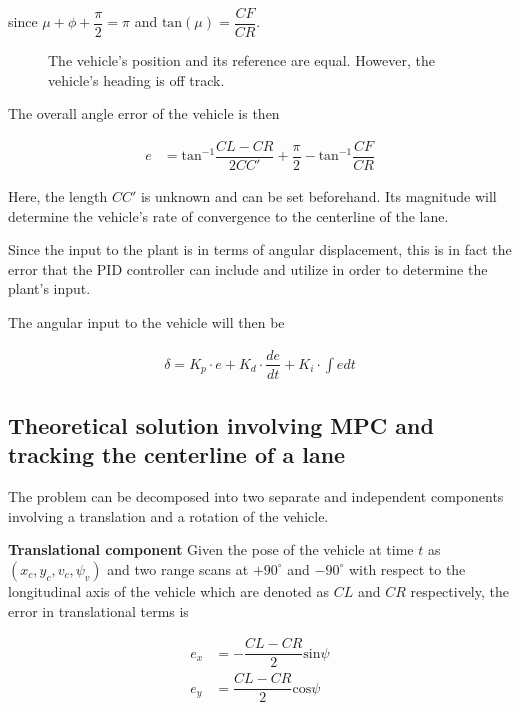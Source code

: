 \documentclass[oneside,12pt]{article}
\begin{document}
    since $\mu + \phi + \dfrac{\pi}{2} = \pi$ and $\text{tan}(\mu) = \dfrac{CF}{CR}$.

    \begin{figure}[H]\centering
      \scalebox{1}{}
      \caption{The vehicle's position and its reference are equal. However,
        the vehicle's heading is off track.}
      \label{}
    \end{figure}

    The overall angle error of the vehicle is then

    \begin{align}
      e &= \text{tan}^{-1}\dfrac{CL-CR}{2CC'} + \dfrac{\pi}{2} - \text{tan}^{-1}\dfrac{CF}{CR}
    \end{align}

    Here, the length $CC'$ is unknown and can be set beforehand. Its magnitude
    will determine the vehicle's rate of convergence to the centerline of the
    lane.

    Since the input to the plant is in terms of angular displacement, this
    is in fact the error that the PID controller can include and utilize in
    order to determine the plant's input.

    The angular input to the vehicle will then be

    \begin{align}
      \delta = K_p \cdot e + K_d \cdot \dfrac{de}{dt} + K_i \cdot \int e dt
    \end{align}




  \subsection{Theoretical solution involving MPC and tracking the centerline of a lane}

    The problem can be decomposed into two separate and independent
    components involving a translation and a rotation of the vehicle.


    \textbf{Translational component} Given the pose of the vehicle at time $t$
    as $(x_c, y_c, v_c, \psi_v)$ and two range scans at $+90^\circ$ and
    $-90^\circ$ with respect to the longitudinal axis of the vehicle which are
    denoted as $CL$ and $CR$ respectively, the error in translational terms is

    \begin{align}
      e_x &= -\dfrac{CL-CR}{2}\text{sin}\psi \\
      e_y &= \dfrac{CL-CR}{2}\text{cos}\psi
    \end{align}
\end{document}
